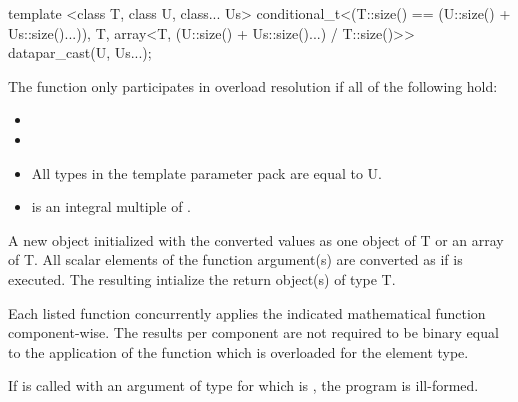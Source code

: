 \begin{itemdecl}
template <class T, class U, class... Us>
conditional_t<(T::size() == (U::size() + Us::size()...)), T,
            array<T, (U::size() + Us::size()...) / T::size()>> datapar_cast(U, Us...);
\end{itemdecl}
\begin{itemdescr}
  \pnum\remarks The  function only participates in overload resolution if all of the following hold:
  \begin{itemize}
    \item {}
    \item {}
    \item All types in the template parameter pack  are equal to \type U.
    \item {} is an integral multiple of .
  \end{itemize}

  \pnum\returns A new \datapar object initialized with the converted values as one object of \type T or an array of \type T.
  All scalar elements  of the function argument(s) are converted as if
   is executed.
  The resulting  intialize the return object(s) of type \type T.
\end{itemdescr}



\pnum Each listed function concurrently applies the indicated mathematical function component-wise.
The results per component are not required to be binary equal to the application of the function which is overloaded for the element type.

\pnum If  is called with an argument of type \datapar[<X, Abi>] for which  is \true, the program is ill-formed.


